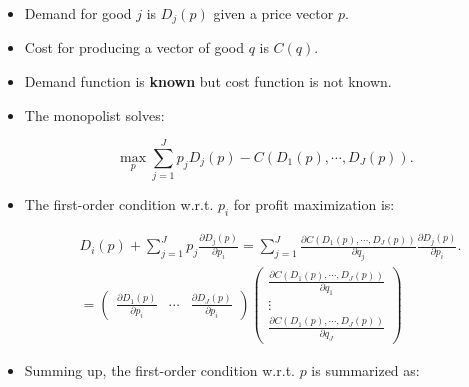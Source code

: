 \documentclass[]{book}
\begin{document}
\begin{itemize}
\item
  Demand for good \(j\) is \(D_j(p)\) given a price vector \(p\).
\item
  Cost for producing a vector of good \(q\) is \(C(q)\).
\item
  Demand function is \textbf{known} but cost function is not known.
\item
  The monopolist solves:

  \begin{equation}
  \max_{p} \sum_{j = 1}^J p_j D_j(p) - C(D_1(p), \cdots, D_J(p)).
  \end{equation}
\item
  The first-order condition w.r.t. \(p_i\) for profit maximization is:

  \begin{equation}
  \begin{split}
  &D_i(p) +  \sum_{j = 1}^J p_j \frac{\partial D_j(p)}{\partial p_i} = \sum_{j = 1}^J \frac{\partial C(D_1(p), \cdots, D_J(p))}{\partial q_j} \frac{\partial D_j(p)}{\partial p_i}.\\
  &= 
  \begin{pmatrix}
  \frac{\partial D_1(p)}{\partial p_i} & \cdots & \frac{\partial D_J(p)}{\partial p_i}
  \end{pmatrix}
  \begin{pmatrix}
  \frac{\partial C(D_1(p), \cdots, D_J(p))}{\partial q_1}\\
  \vdots\\
  \frac{\partial C(D_1(p), \cdots, D_J(p))}{\partial q_J}
  \end{pmatrix}
  \end{split}
  \end{equation}
\item
  Summing up, the first-order condition w.r.t. \(p\) is summarized as:


\end{itemize}
\end{document}
